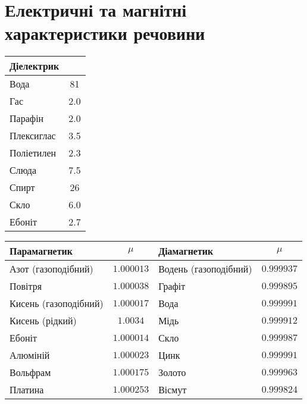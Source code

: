 
\newpage
\section{Електричні та магнітні характеристики речовини}

\begin{table}[h!]\centering
	\label{tab:Dielectric}
	\small
	\begin{tabular}{lc}
		\toprule
		Діелектрик & \epsilon \\ \midrule
		Вода       & 81       \\
		Гас        & 2.0      \\
		Парафін    & 2.0      \\
		Плексиглас & 3.5      \\
		Поліетилен & 2.3      \\
		Слюда      & 7.5      \\
		Спирт      & 26       \\
		Скло       & 6.0      \\
		Ебоніт     & 2.7      \\ \bottomrule
	\end{tabular}
\end{table}

\begin{table}[h!]\centering
	\label{tab:Dielectric}
	\small
	\begin{tabular}{lclc}
		\toprule
		Парамагнетик          & $\mu$      & Діамагнетик           & $\mu$      \\ \midrule
		Азот (газоподібний)   & $1.000013$ & Водень (газоподібний) & $0.999937$ \\
		Повітря               & $1.000038$ & Графіт                & $0.999895$ \\
		Кисень (газоподібний) & $1.000017$ & Вода                  & $0.999991$ \\
		Кисень (рідкий)       & $1.0034$   & Мідь                  & $0.999912$ \\
		Ебоніт                & $1.000014$ & Скло                  & $0.999987$ \\
		Алюміній              & $1.000023$ & Цинк                  & $0.999991$ \\
		Вольфрам              & $1.000175$ & Золото                & $0.999963$ \\
		Платина               & $1.000253$ & Вісмут                & $0.999824$ \\ \bottomrule
	\end{tabular}
\end{table}
